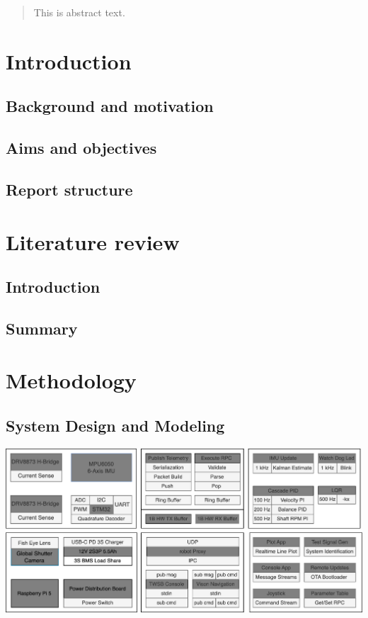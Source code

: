  \uomtoc

  \begin{abstract} %
    This is abstract text.
  \end{abstract}%
  \clearpage
  \section{Introduction}
    \subsection{Background and motivation}
    \subsection{Aims and objectives}
    \subsection{Report structure}
  \section{Literature review} %
    \subsection{Introduction}
      \subsection{Summary}
  \section{Methodology } %
    \subsection{System Design and Modeling }
    \includegraphics[width=\textwidth]{SystemOverview.png}

